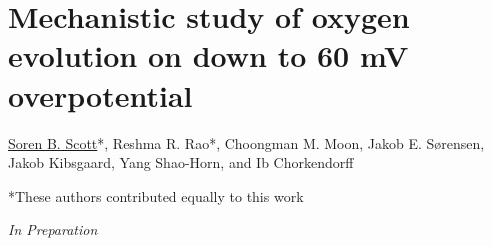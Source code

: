 		
		
				
		\clearpage
		\section[In Preparation - Mechanistic study of oxygen evolution on \ch{RuO2} down to 60 mV overpotential]{Mechanistic study of oxygen evolution on  down to 60 mV overpotential}\label{Scott_Rao2019}
		
		\underline{Soren B. Scott}*, Reshma R. Rao*, Choongman M. Moon, Jakob E. S\o rensen, Jakob Kibsgaard, Yang Shao-Horn, and Ib Chorkendorff
		
		*These authors contributed equally to this work
		
		\textit{In Preparation}
	
	
	
